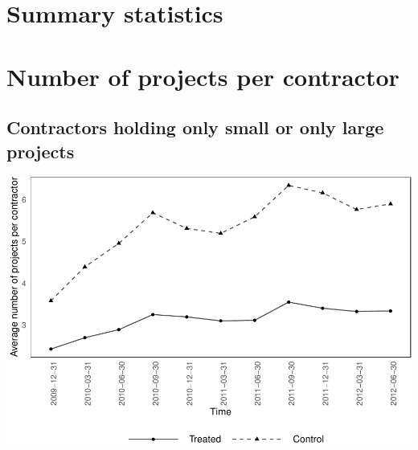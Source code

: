 \documentclass[
]{article}
\begin{document}
\hypertarget{summary-statistics}{%
\section{Summary statistics}\label{summary-statistics}}

\hypertarget{number-of-projects-per-contractor}{%
\section{Number of projects per
contractor}\label{number-of-projects-per-contractor}}

\hypertarget{contractors-holding-only-small-or-only-large-projects}{%
\subsection{Contractors holding only small or only large
projects}\label{contractors-holding-only-small-or-only-large-projects}}

\includegraphics{qp_first_pc_delay-2_files/figure-latex/num_projects_0-1.pdf}
\end{document}
